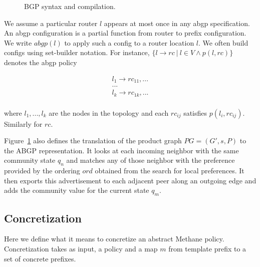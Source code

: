 \documentclass[twocolumn]{sig-alternate-10pt}
\newcommand{\sysname}{{\small \sf Methane}\xspace}
\begin{document}
\begin{figure}[h!]
\begin{minipage}[t]{.5\linewidth}
  \end{minipage}

  \vspace{1em}
  \hrulefill%
  \vspace{1em}

  \caption{BGP syntax and compilation.}
  \label{fig:abgp-syntax}
\end{figure}%

We assume a particular router $l$ appears at most once in any abgp specification.
An abgp configuration is a partial function from router to prefix configuration.
We write $abgp(l)$ to apply such a config to a router location $l$.
%
We often build configs using set-builder notation.  For instance,
$\{l \rightarrow rc ~\vert~ l \in V \wedge p(l,rc)\}$ denotes the abgp policy

\[ \begin{array}{c}
  l_1 \rightarrow rc_{11},... \\
  ...           \\
  l_k \rightarrow rc_{1k},... \\
\end{array} \]


where $l_1, ..., l_k$ are the nodes in the topology
and each $rc_{ij}$ satisfies $p(l_i,rc_{ij})$. Similarly for $rc$.

Figure~\ref{fig:abgp-syntax} also defines the translation of the product graph $PG = (G', s, P)$ to the ABGP representation. It looks at each incoming neighbor with the same community state $q_n$ and matches any of those neighbor with the preference provided by the ordering $ord$ obtained from the search for local preferences. It then exports this advertisement to each adjacent peer along an outgoing edge and adds the community value for the current state $q_m$.


\subsection{Concretization}

Here we define what it means to concretize an abstract \sysname policy. 
Concretization takes as input, a policy and a map $m$ from template prefix to a set of concrete prefixes.
\end{document}
